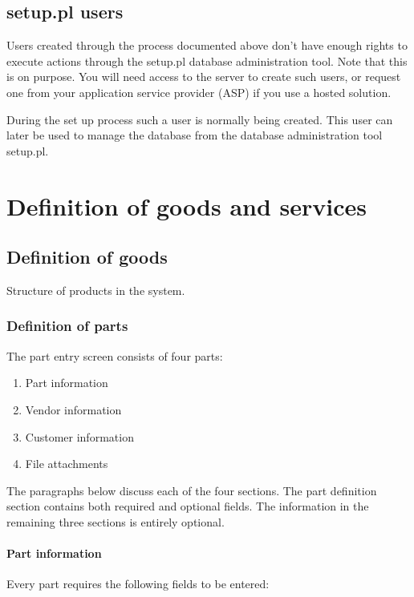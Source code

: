 \section{setup.pl users}

Users created through the process documented above don't have enough rights to
execute actions through the setup.pl database administration tool. Note that this
is on purpose. You will need access to the server to create such users, or request
one from your application service provider (ASP) if you use a hosted solution.

During the set up process such a user is normally being created. This user can later
be used to manage the database from the database administration tool setup.pl.


\chapter{Definition of goods and services}
\label{cha:ProductsDefinition}


\section{Definition of goods}
Structure of products in the system.

\subsection{Definition of parts}
\label{sec:DefinitionOfParts}

The part entry screen consists of four parts:

\begin{enumerate}
\item Part information
\item Vendor information
\item Customer information
\item File attachments
\end{enumerate}


The paragraphs below discuss each of the four sections. The part definition section
contains both required and optional fields. The information in the remaining
three sections is entirely optional.

\subsubsection{Part information}

Every part requires the following fields to be entered:

